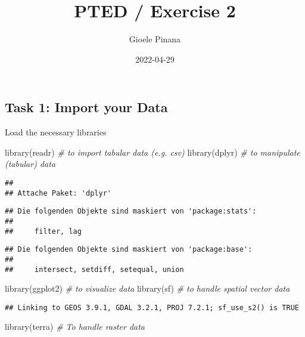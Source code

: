 \documentclass[
]{article}
\title{PTED / Exercise 2}
\author{Gioele Pinana}
\date{2022-04-29}
\newenvironment{Shaded}{\begin{snugshade}}{\end{snugshade}}
\newcommand{\CommentTok}[1]{\textcolor[rgb]{0.56,0.35,0.01}{\textit{#1}}}
\newcommand{\FunctionTok}[1]{\textcolor[rgb]{0.00,0.00,0.00}{#1}}
\newcommand{\NormalTok}[1]{#1}
\begin{document}
\maketitle

\hypertarget{task-1-import-your-data}{%
\subsection{Task 1: Import your Data}\label{task-1-import-your-data}}

Load the necessary libraries

\begin{Shaded}
\begin{Highlighting}[]
\FunctionTok{library}\NormalTok{(readr)        }\CommentTok{\# to import tabular data (e.g. csv)}
\FunctionTok{library}\NormalTok{(dplyr)        }\CommentTok{\# to manipulate (tabular) data}
\end{Highlighting}
\end{Shaded}

\begin{verbatim}
## 
## Attache Paket: 'dplyr'
\end{verbatim}

\begin{verbatim}
## Die folgenden Objekte sind maskiert von 'package:stats':
## 
##     filter, lag
\end{verbatim}

\begin{verbatim}
## Die folgenden Objekte sind maskiert von 'package:base':
## 
##     intersect, setdiff, setequal, union
\end{verbatim}

\begin{Shaded}
\begin{Highlighting}[]
\FunctionTok{library}\NormalTok{(ggplot2)      }\CommentTok{\# to visualize data}
\FunctionTok{library}\NormalTok{(sf)           }\CommentTok{\# to handle spatial vector data}
\end{Highlighting}
\end{Shaded}

\begin{verbatim}
## Linking to GEOS 3.9.1, GDAL 3.2.1, PROJ 7.2.1; sf_use_s2() is TRUE
\end{verbatim}

\begin{Shaded}
\begin{Highlighting}[]
\FunctionTok{library}\NormalTok{(terra)        }\CommentTok{\# To handle raster data}
\end{Highlighting}
\end{Shaded}
\end{document}
